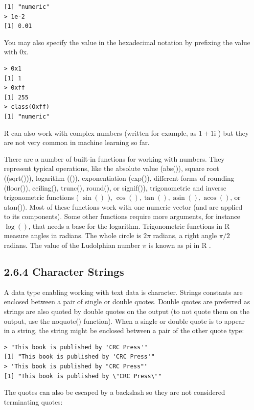 \documentclass[10pt]{book}
\begin{document}
\begin{verbatim}
[1] "numeric"
> 1e-2
[1] 0.01
\end{verbatim}

You may also specify the value in the hexadecimal notation by prefixing the value with 0x.

\begin{verbatim}
> 0x1
[1] 1
> 0xff
[1] 255
> class(Oxff)
[1] "numeric"
\end{verbatim}

R can also work with complex numbers (written for example, as $1+1 \mathrm{i}$ ) but they are not very common in machine learning so far.

There are a number of built-in functions for working with numbers. They represent typical operations, like the absolute value (abs()), square root ((sqrt())), logarithm (()), exponentiation (exp()), different forms of rounding (floor()), ceiling(), trunc(), round(), or signif()), trigonometric and inverse trigonometric functions ( $\sin ()$ ), $\cos (), \tan (), \operatorname{asin}(), \operatorname{acos}()$, or atan()). Most of these functions work with one numeric vector (and are applied to its components). Some other functions require more arguments, for instance $\log ()$, that needs a base for the logarithm. Trigonometric functions in R measure angles in radians. The whole circle is $2 \pi$ radians, a right angle $\pi / 2$ radians. The value of the Ludolphian number $\pi$ is known as pi in R .

\subsection*{2.6.4 Character Strings}
A data type enabling working with text data is character. Strings constants are enclosed between a pair of single or double quotes. Double quotes are preferred as strings are also quoted by double quotes on the output (to not quote them on the output, use the noquote() function). When a single or double quote is to appear in a string, the string might be enclosed between a pair of the other quote type:

\begin{verbatim}
> "This book is published by 'CRC Press'"
[1] "This book is published by 'CRC Press'"
> 'This book is published by "CRC Press"'
[1] "This book is published by \"CRC Press\""
\end{verbatim}

The quotes can also be escaped by a backslash so they are not considered terminating quotes:
\end{document}
